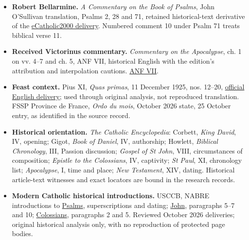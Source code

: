 \begin{itemize}[leftmargin=1.2em,itemsep=.55em]
\item \textbf{Robert Bellarmine.}
\emph{A Commentary on the Book of Psalms}, John O'Sullivan translation, Psalms 2, 28 and 71, retained historical-text derivative of the \href{https://www.ecatholic2000.com/bellarmine/commentary-on-psalms.shtml}{eCatholic2000 delivery}. Numbered comment 10 under Psalm 71 treats biblical verse 11.
\item \textbf{Received Victorinus commentary.}
\emph{Commentary on the Apocalypse}, ch. 1 on vv. 4--7 and ch. 5, ANF VII, historical English with the edition's attribution and interpolation cautions. \href{https://www.ccel.org/ccel/schaff/anf07.html}{ANF VII}.
\item \textbf{Feast context.}
Pius XI, \emph{Quas primas}, 11 December 1925, nos. 12--20, \href{https://www.vatican.va/content/pius-xi/en/encyclicals/documents/hf_p-xi_enc_11121925_quas-primas.html}{official English delivery}; used through original analysis, not reproduced translation. FSSP Province de France, \emph{Ordo du mois}, October 2026 state, 25 October entry, as identified in the source record.
\item \textbf{Historical orientation.}
\emph{The Catholic Encyclopedia}: Corbett, \emph{King David}, IV, opening; Gigot, \emph{Book of Daniel}, IV, authorship; Howlett, \emph{Biblical Chronology}, III, Passion discussion; \emph{Gospel of St John}, VIII, circumstances of composition; \emph{Epistle to the Colossians}, IV, captivity; \emph{St Paul}, XI, chronology list; \emph{Apocalypse}, I, time and place; \emph{New Testament}, XIV, dating. Historical article-text witnesses and exact locators are bound in the research records.
\item \textbf{Modern Catholic historical introductions.}
USCCB, NABRE introductions to \href{https://bible.usccb.org/bible/psalms/0}{Psalms}, superscriptions and dating; \href{https://bible.usccb.org/bible/john/0}{John}, paragraphs 5--7 and 10; \href{https://bible.usccb.org/bible/colossians/0?bk=Colossians&ch=}{Colossians}, paragraphs 2 and 5. Reviewed October 2026 deliveries; original historical analysis only, with no reproduction of protected page bodies.
\end{itemize}
